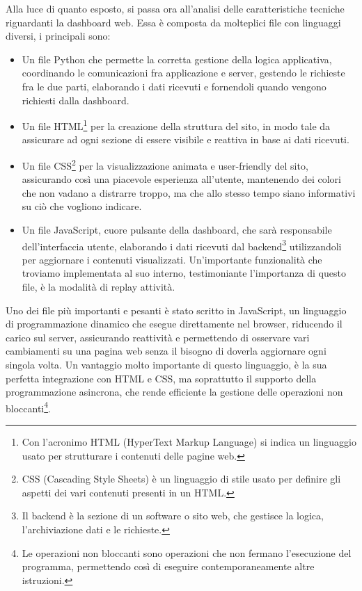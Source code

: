 \documentclass[target=bach,aauheader=,style=]{thud}
\begin{document}
Alla luce di quanto esposto, si passa ora all'analisi delle caratteristiche tecniche riguardanti la dashboard web. Essa è composta da molteplici file con linguaggi diversi, i principali sono:

\begin{itemize}
    \item Un file Python che permette la corretta gestione della logica applicativa, coordinando le comunicazioni fra applicazione e server, gestendo le richieste fra le due parti, elaborando i dati ricevuti e fornendoli quando vengono richiesti dalla dashboard.
    \item Un file HTML\footnote{Con l'acronimo HTML (HyperText Markup Language) si indica un linguaggio usato per strutturare i contenuti delle pagine web.} per la creazione della struttura del sito, in modo tale da assicurare ad ogni sezione di essere visibile e reattiva in base ai dati ricevuti.
    \item Un file CSS\footnote{CSS (Cascading Style Sheets) è un linguaggio di stile usato per definire gli aspetti dei vari contenuti presenti in un HTML.} per la visualizzazione animata e user-friendly del sito, assicurando così una piacevole esperienza all'utente, mantenendo dei colori che non vadano a distrarre troppo, ma che allo stesso tempo siano informativi su ciò che vogliono indicare.
    \item Un file JavaScript, cuore pulsante della dashboard, che sarà responsabile dell'interfaccia utente, elaborando i dati ricevuti dal backend\footnote{Il backend è la sezione di un software o sito web, che gestisce la logica, l'archiviazione dati e le richieste.} utilizzandoli per aggiornare i contenuti visualizzati. Un'importante funzionalità che troviamo implementata al suo interno, testimoniante l'importanza di questo file, è la modalità di replay attività. 
\end{itemize}
Uno dei file più importanti e pesanti è stato scritto in JavaScript, un linguaggio di programmazione dinamico che esegue direttamente nel browser, riducendo il carico sul server, assicurando reattività e permettendo di osservare vari cambiamenti su una pagina web senza il bisogno di doverla aggiornare ogni singola volta. Un vantaggio molto importante di questo linguaggio, è la sua perfetta integrazione con HTML e CSS, ma soprattutto il supporto della programmazione asincrona, che rende efficiente la gestione delle operazioni non bloccanti\footnote{Le operazioni non bloccanti sono operazioni che non fermano l'esecuzione del programma, permettendo così di eseguire contemporaneamente altre istruzioni.}.
\end{document}
